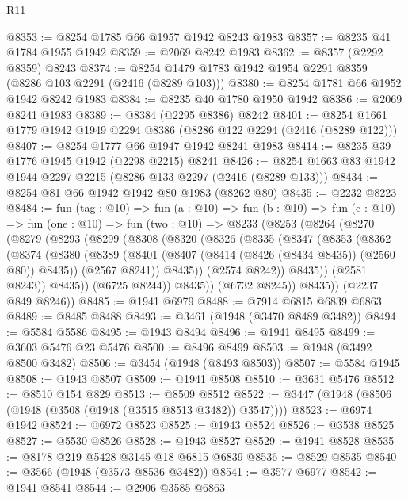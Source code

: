 \begin{lexlean}{R11}
\begin{coremodule}
@8353 := @8254 @1785 @66 @1957 @1942 @8243 @1983
@8357 := @8235 @41 @1784 @1955 @1942
@8359 := @2069 @8242 @1983
@8362 := @8357 (@2292 @8359) @8243
@8374 := @8254 @1479 @1783 @1942 @1954 @2291 @8359 (@8286 @103 @2291 (@2416 (@8289 @103)))
@8380 := @8254 @1781 @66 @1952 @1942 @8242 @1983
@8384 := @8235 @40 @1780 @1950 @1942
@8386 := @2069 @8241 @1983
@8389 := @8384 (@2295 @8386) @8242
@8401 := @8254 @1661 @1779 @1942 @1949 @2294 @8386 (@8286 @122 @2294 (@2416 (@8289 @122)))
@8407 := @8254 @1777 @66 @1947 @1942 @8241 @1983
@8414 := @8235 @39 @1776 @1945 @1942 (@2298 @2215) @8241
@8426 := @8254 @1663 @83 @1942 @1944 @2297 @2215 (@8286 @133 @2297 (@2416 (@8289 @133)))
@8434 := @8254 @81 @66 @1942 @1942 @80 @1983 (@8262 @80)
@8435 := @2232 @8223
@8484 := fun (tag : @10) =>
  fun (a : @10) =>
  fun (b : @10) =>
  fun (c : @10) =>
  fun (one : @10) =>
  fun (two : @10) =>
  @8233
    (@8253
      (@8264
        (@8270
          (@8279
            (@8293
              (@8299
                (@8308
                  (@8320
                    (@8326
                      (@8335
                        (@8347
                          (@8353
                            (@8362
                              (@8374
                                (@8380
                                  (@8389
                                    (@8401 (@8407 (@8414 (@8426 (@8434 @8435)) (@2560 @80)) @8435))
                                    (@2567 @8241))
                                  @8435))
                              (@2574 @8242))
                            @8435))
                        (@2581 @8243))
                      @8435))
                  (@6725 @8244))
                @8435))
            (@6732 @8245))
          @8435))
      (@2237 @849 @8246))
@8485 := @1941 @6979
@8488 := @7914 @6815 @6839 @6863
@8489 := @8485 @8488
@8493 := @3461 (@1948 (@3470 @8489 @3482))
@8494 := @5584 @5586
@8495 := @1943 @8494
@8496 := @1941 @8495
@8499 := @3603 @5476 @23 @5476
@8500 := @8496 @8499
@8503 := @1948 (@3492 @8500 @3482)
@8506 := @3454 (@1948 (@8493 @8503))
@8507 := @5584 @1945
@8508 := @1943 @8507
@8509 := @1941 @8508
@8510 := @3631 @5476
@8512 := @8510 @154 @829
@8513 := @8509 @8512
@8522 := @3447 (@1948 (@8506 (@1948 (@3508 (@1948 (@3515 @8513 @3482)) @3547))))
@8523 := @6974 @1942
@8524 := @6972 @8523
@8525 := @1943 @8524
@8526 := @3538 @8525
@8527 := @5530 @8526
@8528 := @1943 @8527
@8529 := @1941 @8528
@8535 := @8178 @219 @5428 @3145 @18 @6815 @6839
@8536 := @8529 @8535
@8540 := @3566 (@1948 (@3573 @8536 @3482))
@8541 := @3577 @6977
@8542 := @1941 @8541
@8544 := @2906 @3585 @6863

\end{coremodule}
\end{lexlean}
